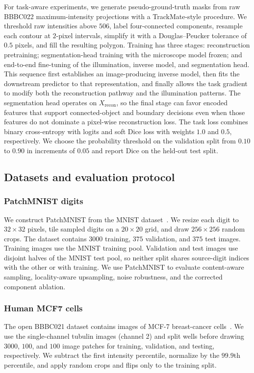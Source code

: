 \documentclass{optica-article}
\begin{document}
For task-aware experiments, we generate pseudo-ground-truth masks from raw BBBC022 maximum-intensity projections with a TrackMate-style procedure. We threshold raw intensities above $506$, label four-connected components, resample each contour at $2$-pixel intervals, simplify it with a Douglas--Peucker tolerance of $0.5$ pixels, and fill the resulting polygon. Training has three stages: reconstruction pretraining; segmentation-head training with the microscope model frozen; and end-to-end fine-tuning of the illumination, inverse model, and segmentation head. This sequence first establishes an image-producing inverse model, then fits the downstream predictor to that representation, and finally allows the task gradient to modify both the reconstruction pathway and the illumination patterns. The segmentation head operates on $X_{\mathrm{recon}}$, so the final stage can favor encoded features that support connected-object and boundary decisions even when those features do not dominate a pixel-wise reconstruction loss. The task loss combines binary cross-entropy with logits and soft Dice loss with weights $1.0$ and $0.5$, respectively. We choose the probability threshold on the validation split from $0.10$ to $0.90$ in increments of $0.05$ and report Dice on the held-out test split.

\subsection{Datasets and evaluation protocol}
\label{sec:datasets-evaluation}


\subsubsection{PatchMNIST digits}
We construct PatchMNIST from the MNIST dataset~\cite{deng2012mnist}. We resize each digit to $32\times32$ pixels, tile sampled digits on a $20\times20$ grid, and draw $256\times256$ random crops. The dataset contains $3000$ training, $375$ validation, and $375$ test images. Training images use the MNIST training pool. Validation and test images use disjoint halves of the MNIST test pool, so neither split shares source-digit indices with the other or with training. We use PatchMNIST to evaluate content-aware sampling, locality-aware upsampling, noise robustness, and the corrected component ablation.

\subsubsection{Human MCF7 cells}
The open BBBC021 dataset contains images of MCF-7 breast-cancer cells~\cite{caie2010high}. We use the single-channel tubulin images (channel 2) and split wells before drawing $3000$, $100$, and $100$ image patches for training, validation, and testing, respectively. We subtract the first intensity percentile, normalize by the $99.9$th percentile, and apply random crops and flips only to the training split.
\end{document}
